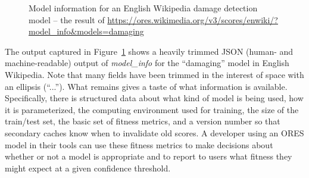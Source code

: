 \begin{figure}[htbp]
        \caption{Model information for an English Wikipedia damage detection model -- the result of \url{https://ores.wikimedia.org/v3/scores/enwiki/?model_info&models=damaging}}
        \label{fig:english_damaging_model_info}
\end{figure}

The output captured in Figure~\ref{fig:english_damaging_model_info} shows a heavily trimmed JSON (human- and machine-readable) output of \emph{model\_info} for the ``damaging'' model in English Wikipedia.  Note that many fields have been trimmed in the interest of space with an ellipsis (``...'').  What remains gives a taste of what information is available.  Specifically, there is structured data about what kind of model is being used, how it is parameterized, the computing environment used for training, the size of the train/test set, the basic set of fitness metrics, and a version number so that secondary caches know when to invalidate old scores.  A developer using an ORES model in their tools can use these fitness metrics to make decisions about whether or not a model is appropriate and to report to users what fitness they might expect at a given confidence threshold.

